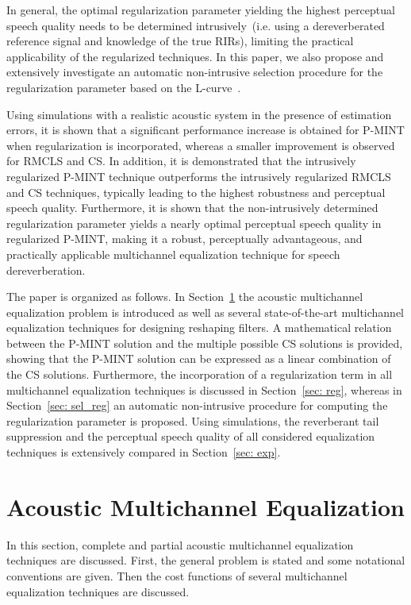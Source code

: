 \documentclass[10pt]{IEEEtran}
\begin{document}
In general, the optimal regularization parameter yielding the highest perceptual speech quality needs to be determined intrusively~(i.e. using a dereverberated reference signal and knowledge of the true RIRs), limiting the practical applicability of the regularized techniques.
In this paper, we also propose and extensively investigate an automatic non-intrusive selection procedure for the regularization parameter based on the L-curve~\cite{Hansen_1993}.

Using simulations with a realistic acoustic system in the presence of estimation errors, it is shown that a significant performance increase is obtained for P-MINT when regularization is incorporated, whereas a smaller improvement is observed for RMCLS and CS.
In addition, it is demonstrated that the intrusively regularized P-MINT technique outperforms the intrusively regularized RMCLS and CS techniques, typically leading to the highest robustness and perceptual speech quality.
Furthermore, it is shown that the non-intrusively determined regularization parameter yields a nearly optimal perceptual speech quality in regularized P-MINT, making it a robust, perceptually advantageous, and practically applicable multichannel equalization technique for speech dereverberation.

The paper is organized as follows.
In Section~\ref{sec: intro} the acoustic multichannel equalization problem is introduced as well as several state-of-the-art multichannel equalization  techniques for designing reshaping filters.
A mathematical relation between the P-MINT solution and the multiple possible CS solutions is provided, showing that the P-MINT solution can be expressed as a linear combination of the CS solutions.
Furthermore, the incorporation of a regularization term in all multichannel equalization techniques is discussed in Section~\ref{sec: reg}, whereas in  Section~\ref{sec: sel_reg} an automatic non-intrusive procedure for computing the regularization parameter is proposed.
Using simulations, the reverberant tail suppression and the perceptual speech quality of all considered equalization techniques is extensively compared in Section~\ref{sec: exp}.

\section{Acoustic Multichannel Equalization}
\label{sec: intro}
In this section, complete and partial acoustic multichannel equalization techniques are discussed.
First, the general problem is stated and some notational conventions are given.
Then the cost functions of several multichannel equalization techniques are discussed.
\end{document}
